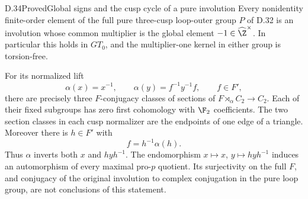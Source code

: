 \begin{claim}{D.34}{Proved}{Global signs and the cusp cycle of a pure involution}
Every nonidentity finite-order element of the full pure
three-cusp loop-outer group $P$ of D.32 is an involution
whose common multiplier is the global element
$-1\in\widehat\Z^\times$.  In particular this holds in
$GT_0$, and the multiplier-one kernel in either group is
torsion-free.

For its normalized lift
\[
 \alpha(x)=x^{-1},\qquad\alpha(y)=f^{-1}y^{-1}f,
                      \qquad f\in F',
                                                        \tag{D.34a}
\]
there are precisely three $F$-conjugacy classes of sections
of $F\rtimes_\alpha C_2\to C_2$.  Each of their fixed
subgroups has zero first cohomology with $\F_2$ coefficients.
The two section classes in each cusp normalizer are the
endpoints of one edge of a triangle.  Moreover there is
$h\in F'$ with
\[
                         f=h^{-1}\alpha(h).               \tag{D.34b}
\]
Thus $\alpha$ inverts both $x$ and $hyh^{-1}$.
The endomorphism $x\mapsto x$, $y\mapsto hyh^{-1}$ induces
an automorphism of every maximal pro-$p$ quotient.  Its
surjectivity on the full $F$, and conjugacy of the original
involution to complex conjugation in the pure loop group,
are not conclusions of this statement.
\end{claim}
